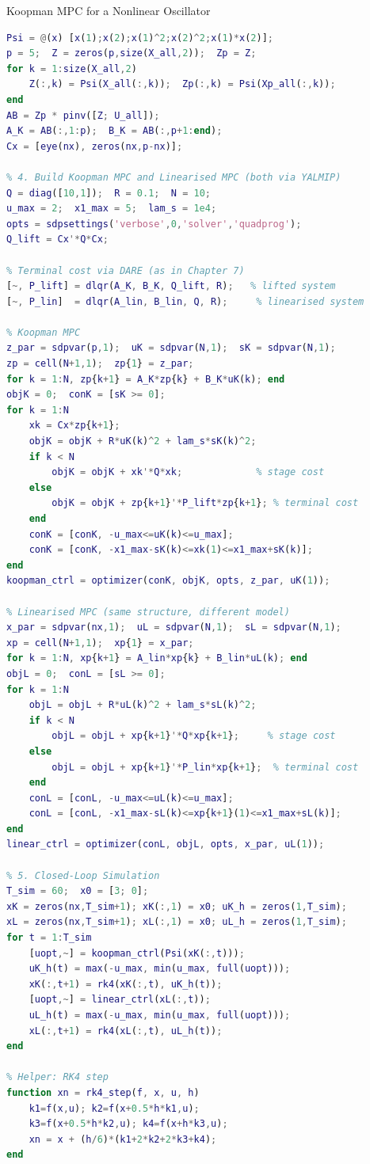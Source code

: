 \begin{examplebox}{Koopman MPC for a Nonlinear Oscillator}
\begin{lstlisting}[language=Matlab, caption={Koopman MPC vs Linearised MPC for a Duffing oscillator (RK4).}]
% 3. EDMD Identification
Psi = @(x) [x(1);x(2);x(1)^2;x(2)^2;x(1)*x(2)];
p = 5;  Z = zeros(p,size(X_all,2));  Zp = Z;
for k = 1:size(X_all,2)
    Z(:,k) = Psi(X_all(:,k));  Zp(:,k) = Psi(Xp_all(:,k));
end
AB = Zp * pinv([Z; U_all]);
A_K = AB(:,1:p);  B_K = AB(:,p+1:end);
Cx = [eye(nx), zeros(nx,p-nx)];

% 4. Build Koopman MPC and Linearised MPC (both via YALMIP)
Q = diag([10,1]);  R = 0.1;  N = 10;
u_max = 2;  x1_max = 5;  lam_s = 1e4;
opts = sdpsettings('verbose',0,'solver','quadprog');
Q_lift = Cx'*Q*Cx;

% Terminal cost via DARE (as in Chapter 7)
[~, P_lift] = dlqr(A_K, B_K, Q_lift, R);   % lifted system
[~, P_lin]  = dlqr(A_lin, B_lin, Q, R);     % linearised system

% Koopman MPC
z_par = sdpvar(p,1);  uK = sdpvar(N,1);  sK = sdpvar(N,1);
zp = cell(N+1,1);  zp{1} = z_par;
for k = 1:N, zp{k+1} = A_K*zp{k} + B_K*uK(k); end
objK = 0;  conK = [sK >= 0];
for k = 1:N
    xk = Cx*zp{k+1};
    objK = objK + R*uK(k)^2 + lam_s*sK(k)^2;
    if k < N
        objK = objK + xk'*Q*xk;             % stage cost
    else
        objK = objK + zp{k+1}'*P_lift*zp{k+1}; % terminal cost
    end
    conK = [conK, -u_max<=uK(k)<=u_max];
    conK = [conK, -x1_max-sK(k)<=xk(1)<=x1_max+sK(k)];
end
koopman_ctrl = optimizer(conK, objK, opts, z_par, uK(1));

% Linearised MPC (same structure, different model)
x_par = sdpvar(nx,1);  uL = sdpvar(N,1);  sL = sdpvar(N,1);
xp = cell(N+1,1);  xp{1} = x_par;
for k = 1:N, xp{k+1} = A_lin*xp{k} + B_lin*uL(k); end
objL = 0;  conL = [sL >= 0];
for k = 1:N
    objL = objL + R*uL(k)^2 + lam_s*sL(k)^2;
    if k < N
        objL = objL + xp{k+1}'*Q*xp{k+1};     % stage cost
    else
        objL = objL + xp{k+1}'*P_lin*xp{k+1};  % terminal cost
    end
    conL = [conL, -u_max<=uL(k)<=u_max];
    conL = [conL, -x1_max-sL(k)<=xp{k+1}(1)<=x1_max+sL(k)];
end
linear_ctrl = optimizer(conL, objL, opts, x_par, uL(1));

% 5. Closed-Loop Simulation
T_sim = 60;  x0 = [3; 0];
xK = zeros(nx,T_sim+1); xK(:,1) = x0; uK_h = zeros(1,T_sim);
xL = zeros(nx,T_sim+1); xL(:,1) = x0; uL_h = zeros(1,T_sim);
for t = 1:T_sim
    [uopt,~] = koopman_ctrl(Psi(xK(:,t)));
    uK_h(t) = max(-u_max, min(u_max, full(uopt)));
    xK(:,t+1) = rk4(xK(:,t), uK_h(t));
    [uopt,~] = linear_ctrl(xL(:,t));
    uL_h(t) = max(-u_max, min(u_max, full(uopt)));
    xL(:,t+1) = rk4(xL(:,t), uL_h(t));
end

% Helper: RK4 step
function xn = rk4_step(f, x, u, h)
    k1=f(x,u); k2=f(x+0.5*h*k1,u);
    k3=f(x+0.5*h*k2,u); k4=f(x+h*k3,u);
    xn = x + (h/6)*(k1+2*k2+2*k3+k4);
end
\end{lstlisting}
\end{examplebox}


